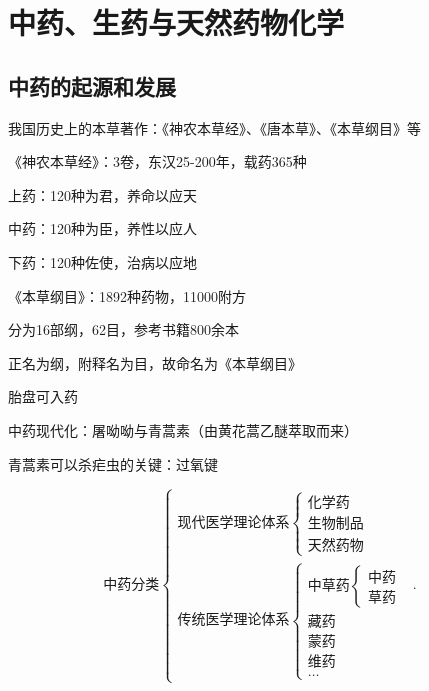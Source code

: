 \section{中药、生药与天然药物化学}%
\label{sec:中药、生药与天然药物化学}
\subsection{中药的起源和发展}%
\label{sub:中药的起源和发展}
    我国历史上的本草著作：《神农本草经》、《唐本草》、《本草纲目》等
\begin{notation}
    《神农本草经》：3卷，东汉25-200年，载药365种

    上药：120种为君，养命以应天

    中药：120种为臣，养性以应人

    下药：120种佐使，治病以应地
\end{notation}
\begin{notation}
    《本草纲目》：1892种药物，11000附方

    分为16部纲，62目，参考书籍800余本

    正名为纲，附释名为目，故命名为《本草纲目》
\end{notation}
\begin{eg}
    胎盘可入药
\end{eg}
中药现代化：屠呦呦与青蒿素（由黄花蒿乙醚萃取而来）
\begin{notation}
    青蒿素可以杀疟虫的关键：过氧键
\end{notation}
\[
    \text{中药分类}
    \begin{cases}
        \text{现代医学理论体系}
        \begin{cases}
            \text{化学药}\\ 
            \text{生物制品}\\ 
            \text{天然药物}
        \end{cases}\\
        \text{传统医学理论体系}
        \begin{cases}
            \text{中草药}
            \begin{cases}
                \text{中药}\\ 
                \text{草药}
            \end{cases}\\
            \text{藏药}\\ 
            \text{蒙药}\\ 
            \text{维药}\\
            \ldots
        \end{cases}
    \end{cases}
.\] 
